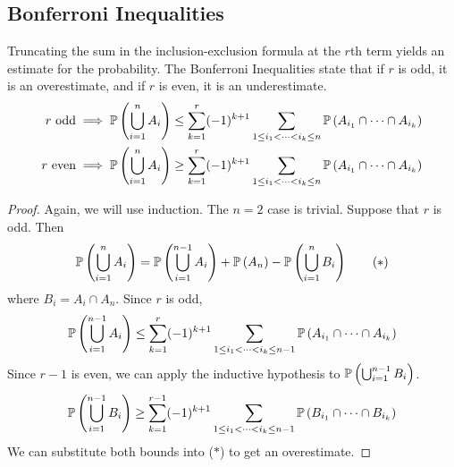 \documentclass{article}
\begin{document}
\subsection{Bonferroni Inequalities}
Truncating the sum in the inclusion-exclusion formula at the $r$th term yields an estimate for the probability. The Bonferroni Inequalities state that if $r$ is odd, it is an overestimate, and if $r$ is even, it is an underestimate.
\begin{align*}
    r \text{ odd}  & \implies \mathbb{P}\left({\bigcup_{i=1}^n A_i}\right) \leq \sum_{k=1}^r (-1)^{k+1} \sum_{1 \leq i_1 < \dots < i_k \leq n} \mathbb{P}\left({A_{i_1} \cap \dots \cap A_{i_k}}\right) \\
    r \text{ even} & \implies \mathbb{P}\left({\bigcup_{i=1}^n A_i}\right) \geq \sum_{k=1}^r (-1)^{k+1} \sum_{1 \leq i_1 < \dots < i_k \leq n} \mathbb{P}\left({A_{i_1} \cap \dots \cap A_{i_k}}\right)
\end{align*}
\begin{proof}
    Again, we will use induction. The $n=2$ case is trivial. Suppose that $r$ is odd. Then
    \begin{equation}
        \mathbb{P}\left({\bigcup_{i=1}^n A_i}\right) = \mathbb{P}\left({\bigcup_{i=1}^{n-1} A_i}\right) + \mathbb{P}\left({A_n}\right) - \mathbb{P}\left({\bigcup_{i=1}^n B_i}\right) \tag{$\ast$}
    \end{equation}
    where $B_i = A_i \cap A_n$. Since $r$ is odd,
    \[ \mathbb{P}\left({\bigcup_{i=1}^{n-1} A_i}\right) \leq \sum_{k=1}^r (-1)^{k+1} \sum_{1 \leq i_1 < \dots < i_k \leq n-1} \mathbb{P}\left({A_{i_1} \cap \dots \cap A_{i_k}}\right) \]
    Since $r-1$ is even, we can apply the inductive hypothesis to $\mathbb{P}\left({\bigcup_{i=1}^{n-1} B_i}\right)$.
    \[ \mathbb{P}\left({\bigcup_{i=1}^{n-1} B_i}\right) \geq \sum_{k=1}^{r-1} (-1)^{k+1} \sum_{1 \leq i_1 < \dots < i_k \leq n-1} \mathbb{P}\left({B_{i_1} \cap \dots \cap B_{i_k}}\right) \]
    We can substitute both bounds into ($\ast$) to get an overestimate.
\end{proof}
\end{document}
